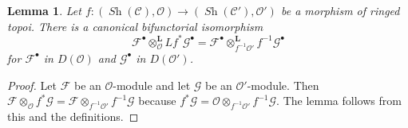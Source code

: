 \documentclass[10pt,a4paper]{amsart}
\theoremstyle{plain}
\newtheorem{lemma}[subsection]{Lemma}
\theoremstyle{definition}
\theoremstyle{remark}
\numberwithin{equation}{subsection}
\def\Sh{\mathop{\mathit{Sh}}\nolimits}
\begin{document}
\begin{lemma}
\label{lemma-variant-derived-pullback}
Let $f : (\Sh(\mathcal{C}), \mathcal{O}) \to (\Sh(\mathcal{C}'), \mathcal{O}')$
be a morphism of ringed topoi. There is a canonical bifunctorial
isomorphism
$$
\mathcal{F}^\bullet
\otimes_\mathcal{O}^{\mathbf{L}}
Lf^*\mathcal{G}^\bullet
=
\mathcal{F}^\bullet 
\otimes_{f^{-1}\mathcal{O}'}^{\mathbf{L}}
f^{-1}\mathcal{G}^\bullet 
$$
for $\mathcal{F}^\bullet$ in $D(\mathcal{O})$ and
$\mathcal{G}^\bullet$ in $D(\mathcal{O}')$.
\end{lemma}

\begin{proof}
Let $\mathcal{F}$ be an $\mathcal{O}$-module and let $\mathcal{G}$
be an $\mathcal{O}'$-module. Then
$\mathcal{F} \otimes_{\mathcal{O}} f^*\mathcal{G} =
\mathcal{F} \otimes_{f^{-1}\mathcal{O}'} f^{-1}\mathcal{G}$
because
$f^*\mathcal{G} =
\mathcal{O} \otimes_{f^{-1}\mathcal{O}'} f^{-1}\mathcal{G}$.
The lemma follows from this and the definitions.
\end{proof}
\end{document}
